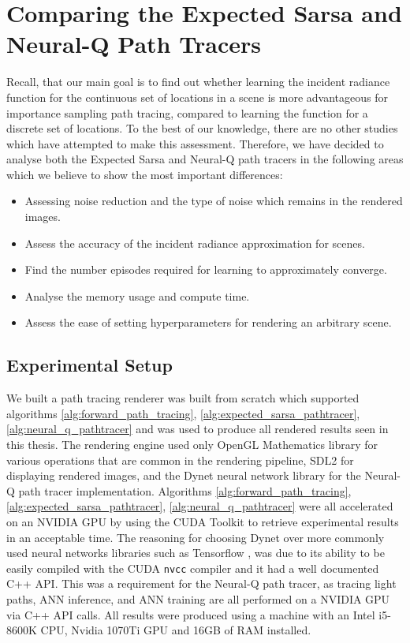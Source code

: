 \documentclass[../dissertation.tex]{subfiles}
\begin{document}
\chapter{Comparing the Expected Sarsa and Neural-Q  Path Tracers}

\label{chap:evaluation}

Recall, that our main goal is to find out whether learning the incident radiance function for the continuous set of locations in a scene is more advantageous for importance sampling path tracing, compared to learning the function for a discrete set of locations. To the best of our knowledge, there are no other studies which have attempted to make this assessment. Therefore, we have decided to analyse both the Expected Sarsa and Neural-Q path tracers in the following areas which we believe to show the most important differences:

\begin{itemize}
\item Assessing noise reduction and the type of noise which remains in the rendered images.
\item Assess the accuracy of the incident radiance approximation for scenes.
\item Find the number episodes required for learning to approximately converge.
\item Analyse the memory usage and compute time.
\item Assess the ease of setting hyperparameters for rendering an arbitrary scene.
\end{itemize}

\section{Experimental Setup}

We built a path tracing renderer was built from scratch which supported algorithms \ref{alg:forward_path_tracing}, \ref{alg:expected_sarsa_pathtracer}, \ref{alg:neural_q_pathtracer} and was used to produce all rendered results seen in this thesis. The rendering engine used only OpenGL Mathematics library \cite{glm} for various operations that are common in the rendering pipeline, SDL2 \cite{sdl2} for displaying rendered images, and the Dynet neural network library \cite{dynet} for the Neural-Q path tracer implementation. Algorithms \ref{alg:forward_path_tracing}, \ref{alg:expected_sarsa_pathtracer}, \ref{alg:neural_q_pathtracer} were all accelerated on an NVIDIA GPU by using the CUDA Toolkit \cite{cuda} to retrieve experimental results in an acceptable time. The reasoning for choosing Dynet over more commonly used neural networks libraries such as Tensorflow \cite{tensorflow2015-whitepaper}, was due to its ability to be easily compiled with the CUDA \verb|nvcc| compiler and it had a well documented C++ API. This was a requirement for the Neural-Q path tracer, as tracing light paths, ANN inference, and ANN training are all performed on a NVIDIA GPU via C++ API calls. All results were produced using a machine with an Intel i5-8600K CPU, Nvidia 1070Ti GPU and 16GB of RAM installed.
\end{document}
